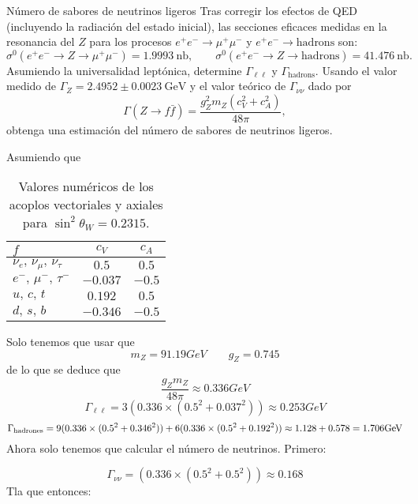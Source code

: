 \begin{Ejercicio}{Número de sabores de neutrinos ligeros}\label{Ej:19}
Tras corregir los efectos de QED (incluyendo la radiación del estado inicial), las secciones eficaces medidas en la resonancia del $Z$ para los procesos 
$e^+e^- \to \mu^+\mu^-$ y $e^+e^- \to \text{hadrons}$ son:
\[
\sigma^0(e^+e^- \to Z \to \mu^+\mu^-) = 1.9993~\text{nb},
\qquad
\sigma^0(e^+e^- \to Z \to \text{hadrons}) = 41.476~\text{nb}.
\]
Asumiendo la universalidad leptónica, determine $\Gamma_{\ell\ell}$ y $\Gamma_{\text{hadrons}}$.
Usando el valor medido de $\Gamma_Z = 2.4952 \pm 0.0023~\text{GeV}$ y el valor teórico de $\Gamma_{\nu\nu}$ dado por
\[
\Gamma(Z \to f\bar{f}) = \frac{g_Z^2 m_Z (c_V^2 + c_A^2)}{48\pi},
\]
obtenga una estimación del número de sabores de neutrinos ligeros.
\end{Ejercicio}
Asumiendo que 
\begin{table}[h!]
\centering
\begin{tabular}{lcc}
\toprule
$f$ & $c_V$ & $c_A$ \\
\midrule
$\nu_e,\, \nu_\mu,\, \nu_\tau$ & $0.5$ & $0.5$ \\
$e^-,\, \mu^-,\, \tau^-$ & $-0.037$ & $-0.5$ \\
$u,\, c,\, t$ & $0.192$ & $0.5$ \\
$d,\, s,\, b$ & $-0.346$ & $-0.5$ \\
\bottomrule
\end{tabular}
\caption{Valores numéricos de los acoplos vectoriales y axiales para $\sin^2\theta_W = 0.2315$.}
\label{tab:coeficientes_weak_num}
\end{table}
Solo tenemos que usar que 
\begin{equation}
	m_Z = 91.19 \unit{GeV} \qquad g_Z = 0.745
\end{equation}
de lo que se deduce que
\begin{equation}
	\frac{g_Zm_Z}{48\pi} \approx 0.336 \unit{GeV}
\end{equation}
\begin{equation}
	\Gamma_{\ell \ell} = 3 (0.336\times (0.5^2 + 0.037^2)) \approx 0.253 \unit{GeV} 
\end{equation}
\begin{equation} \small
	\Gamma_{\text{hadrones}} = 9 (0.336\times (0.5^2 + 0.346^2)) + 6   (0.336\times (0.5^2 + 0.192^2))\approx 1.128+0.578 = 1.706 \unit{GeV} 
\end{equation}
Ahora solo tenemos que calcular el número de neutrinos. Primero: 

\begin{equation}
	\Gamma_{{\nu \nu}} = (0.336\times (0.5^2 + 0.5^2)) \approx 0.168
\end{equation}
Tla que entonces: 

